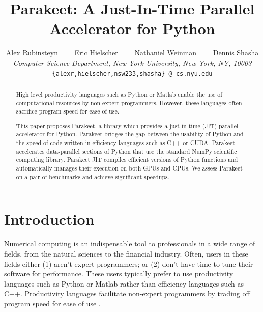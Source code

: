 \documentclass[10pt,twocolumn]{article}
\begin{document}
\title{Parakeet: A Just-In-Time Parallel Accelerator for Python}
\author{
Alex Rubinsteyn \ \ \ \ Eric Hielscher \ \ \ \ Nathaniel Weinman \ \ \ \
Dennis Shasha \\
{\it Computer Science Department, New York University, New York, NY, 10003} \\
\small{\tt \{alexr,hielscher,nsw233,shasha\} @ cs.nyu.edu}
}
\date{}

\newcommand{\MAP}{\impfnt{map}}
\newcommand{\REDUCE}{\impfnt{reduce}}
\newcommand{\SCAN}{\impfnt{scan}}
\newcommand{\ALLPAIRS}{\impfnt{allpairs}}
\newcommand{\concat}{\ensuremath{+\!\!\!\!+\,}}

\setlength\fboxsep{8pt}
\setlength\fboxrule{0.5pt}

\maketitle

\begin{abstract}
High level productivity languages such as Python or Matlab enable the use of computational resources by non-expert programmers.  However, these languages often sacrifice program speed for ease of use.

This paper proposes Parakeet, a library which provides a just-in-time (JIT) parallel accelerator for Python.  Parakeet bridges the gap between the usability of Python and the speed of code written in efficiency languages such as C++ or CUDA.  Parakeet accelerates data-parallel sections of Python that use the standard NumPy scientific computing library.  Parakeet JIT compiles efficient versions of Python functions and automatically manages their execution on both GPUs and CPUs.  We assess Parakeet on a pair of benchmarks and achieve significant speedups. 
\end{abstract}

\section{Introduction}
\label{Intro}
Numerical computing is an indispensable tool to professionals in a wide range of fields, from the natural sciences to the financial industry.  Often, users in these fields either (1) aren't expert programmers; or (2) don't have time to tune their software for performance.  These users typically prefer to use productivity languages such as Python or Matlab rather than efficiency languages such as C++.  Productivity languages facilitate non-expert programmers by trading off program speed for ease of use \cite{Pre03}.
\end{document}
